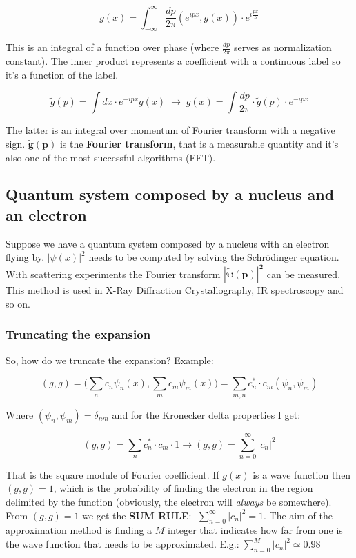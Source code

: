 		$$g(x)=\int_{-\infty}^{\infty}\frac{dp}{2\pi}(e^{ipx},g(x))\cdot e^{i\frac{px}{\hbar}}$$

		This is an integral of a function over phase (where $\frac{dp}{2\pi}$ serves as normalization constant).
		The inner product represents a coefficient with a continuous label so it's a function of the label.

		$$\tilde{g}(p)=\int dx\cdot e^{-ipx}g(x)\; \rightarrow \; g(x)=\int \frac{dp}{2\pi} \cdot \tilde{g}(p) \cdot e^{-ipx}$$

		The latter is an integral over momentum of Fourier transform with a negative sign.
		$\mathbf{\tilde{g}(p)}$ is the \textbf{Fourier transform}, that is a measurable quantity and it's also one of the most successful algorithms (FFT).

	\subsection{Quantum system composed by a nucleus and an electron}
	Suppose we have a quantum system composed by a nucleus with an electron flying by.
	$|\psi(x)|^2$ needs to be computed by solving the Schr{\"o}dinger equation.
	With scattering experiments the Fourier transform $\mathbf{|\tilde{\psi}(p)|^2}$ can be measured.
	This method is used in X-Ray Diffraction Crystallography, IR spectroscopy and so on.

		\subsubsection{Truncating the expansion}
		So, how do we truncate the expansion? Example:

		$$(g,g)=\biggl(\sum_nc_n\psi_n(x), \sum_mc_m\psi_m(x)\biggr) = \sum_{m,n}c_n^*\cdot c_m(\psi_n, \psi_m)$$

		Where $(\psi_n,\psi_m)=\delta_{nm}$ and for the Kronecker delta properties I get:

		$$(g,g)= \sum_nc_n^* \cdot c_m \cdot 1 \rightarrow (g,g)=\sum_{n=0}^{\infty}|c_n|^2$$

		That is the square module of Fourier coefficient.
		If $g(x)$ is a wave function then $(g,g)=1$, which is the probability of finding the electron in the region delimited by the function (obviously, the electron will \textit{always} be somewhere).
		From $(g,g)=1$ we get the \textbf{SUM RULE}: $\; \sum_{n=0}^{\infty}|c_n|^2=1$.
		The aim of the approximation method is finding a $M$ integer that indicates how far from one is the wave function that needs to be approximated.
		E.g.:$\; \sum_{n=0}^{M}|c_n|^2 \simeq 0.98$

